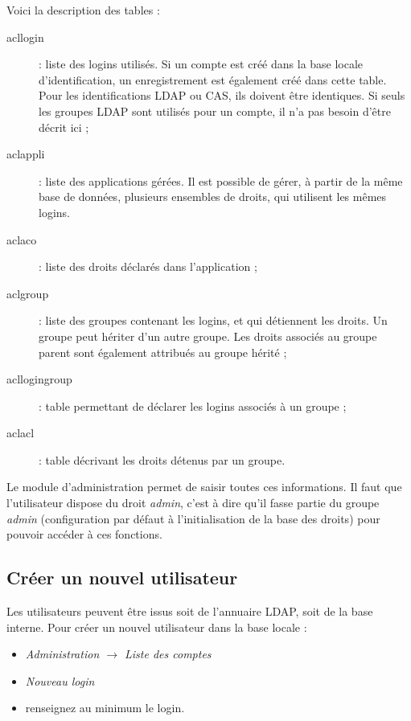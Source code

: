 Voici la description des tables :
\begin{description}
\item[acllogin] : liste des logins utilisés. Si un compte est créé dans la base locale d'identification, un enregistrement est également créé dans cette table. Pour les identifications LDAP ou CAS, ils doivent être identiques. Si seuls les groupes LDAP sont utilisés pour un compte, il n'a pas besoin d'être décrit ici ;
\item[aclappli] : liste des applications gérées. Il est possible de gérer, à partir de la même base de données, plusieurs ensembles de droits, qui utilisent les mêmes logins.
\item[aclaco] : liste des droits déclarés dans l'application ;
\item[aclgroup] : liste des groupes contenant les logins, et qui détiennent les droits. Un groupe peut hériter d'un autre groupe. Les droits associés au groupe parent sont également attribués au groupe hérité ;
\item[acllogingroup] : table permettant de déclarer les logins associés à un groupe ;
\item[aclacl] : table décrivant les droits détenus par un groupe.
\end{description}

Le module d'administration permet de saisir toutes ces informations. Il faut que l'utilisateur dispose du droit \textit{admin}, c'est à dire qu'il fasse partie du groupe \textit{admin} (configuration par défaut à l'initialisation de la base des droits) pour pouvoir accéder à ces fonctions.

\subsection{Créer un nouvel utilisateur}

Les utilisateurs peuvent être issus soit de l'annuaire LDAP, soit de la base interne. 
Pour créer un nouvel utilisateur dans la base locale :
\begin{itemize}
\item \textit{Administration $\rightarrow$ Liste des comptes }
\item \textit{Nouveau login}
\item renseignez au minimum le login.
\end{itemize}

